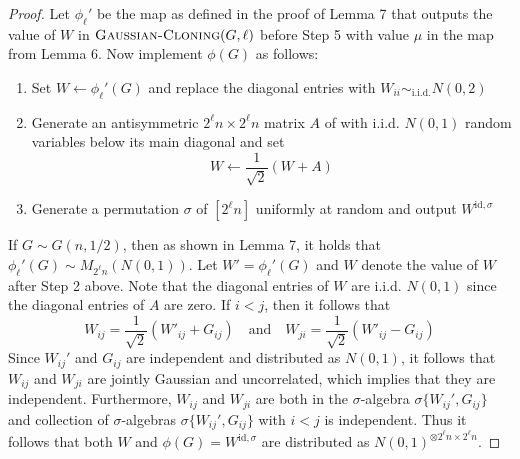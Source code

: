 \documentclass[11pt]{article}
\begin{document}
\begin{proof}
Let $\phi_\ell'$ be the map as defined in the proof of Lemma 7 that outputs the value of $W$ in $\textsc{Gaussian-Cloning}(G, \ell)$ before Step 5 with value $\mu$ in the map from Lemma 6. Now implement $\phi(G)$ as follows:
\begin{enumerate}
\item Set $W \gets \phi_\ell'(G)$ and replace the diagonal entries with $W_{ii} \sim_{\text{i.i.d.}} N(0, 2)$
\item Generate an antisymmetric $2^\ell n \times 2^\ell n$ matrix $A$ of with i.i.d. $N(0, 1)$ random variables below its main diagonal and set
$$W \gets \frac{1}{\sqrt{2}} \left( W + A \right)$$
\item Generate a permutation $\sigma$ of $[2^\ell n]$ uniformly at random and output $W^{\text{id}, \sigma}$
\end{enumerate}
If $G \sim G(n, 1/2)$, then as shown in Lemma 7, it holds that $\phi_\ell'(G) \sim M_{2^\ell n}(N(0,1))$. Let $W' = \phi_\ell'(G)$ and $W$ denote the value of $W$ after Step 2 above. Note that the diagonal entries of $W$ are i.i.d. $N(0, 1)$ since the diagonal entries of $A$ are zero. If $i < j$, then it follows that
$$W_{ij} = \frac{1}{\sqrt{2}} \left( W'_{ij} + G_{ij} \right) \quad \text{and} \quad W_{ji} = \frac{1}{\sqrt{2}} \left( W'_{ij} - G_{ij} \right)$$
Since $W_{ij}'$ and $G_{ij}$ are independent and distributed as $N(0, 1)$, it follows that $W_{ij}$ and $W_{ji}$ are jointly Gaussian and uncorrelated, which implies that they are independent. Furthermore, $W_{ij}$ and $W_{ji}$ are both in the $\sigma$-algebra $\sigma\{W_{ij}', G_{ij}\}$ and collection of $\sigma$-algebras $\sigma\{W_{ij}', G_{ij}\}$ with $i < j$ is independent. Thus it follows that both $W$ and $\phi(G) = W^{\text{id}, \sigma}$ are distributed as $N(0, 1)^{\otimes 2^\ell n \times 2^\ell n}$.


\end{proof}
\end{document}
